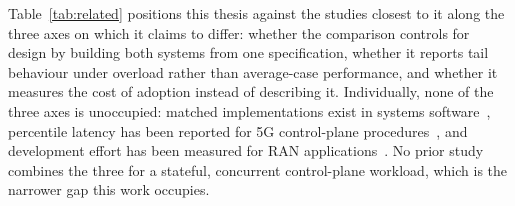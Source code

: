 \documentclass[english,twoside,openright,a4paper,censored,csm,software-track-2020]{HYthesisML}
\begin{document}
Table~\ref{tab:related} positions this thesis against the studies closest to it along the
three axes on which it claims to differ: whether the comparison controls for design by
building both systems from one specification, whether it reports tail behaviour under overload
rather than average-case performance, and whether it measures the cost of adoption instead of
describing it. Individually, none of the three axes is unoccupied: matched implementations
exist in systems software~\cite{emmerich2019drivers,li2021ipc,narayanan2020redleaf},
percentile latency has been reported for 5G control-plane
procedures~\cite{arvidsson2025async}, and development effort has been measured for RAN
applications~\cite{karlback2021ran}. No prior study combines the three for a stateful,
concurrent control-plane workload, which is the narrower gap this work occupies.
\end{document}

